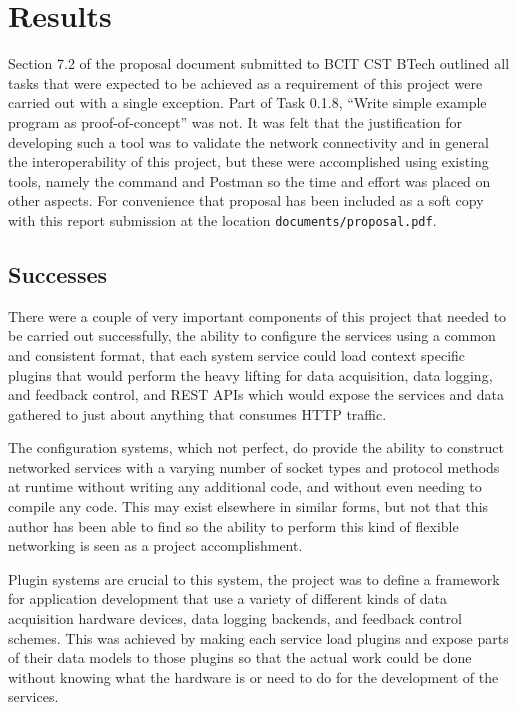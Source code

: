 \section{Results}\label{sec:results}

  Section 7.2 of the proposal document submitted to BCIT CST BTech outlined all
  tasks that were expected to be achieved as a requirement of this project were
  carried out with a single exception. Part of Task 0.1.8, ``Write simple
  example program as proof-of-concept'' was not. It was felt that the
  justification for developing such a tool was to validate the network
  connectivity and in general the interoperability of this project, but these
  were accomplished using existing tools, namely the command  and
  Postman so the time and effort was placed on other aspects. For convenience
  that proposal has been included as a soft copy with this report submission at
  the location \texttt{documents/proposal.pdf}.

  \subsection{Successes}\label{sec:results-successes}

    There were a couple of very important components of this project that
    needed to be carried out successfully, the ability to configure the
    services using a common and consistent format, that each system service
    could load context specific plugins that would perform the heavy lifting
    for data acquisition, data logging, and feedback control, and REST APIs
      which would expose the services and data gathered to just about anything
      that consumes HTTP traffic.

    The configuration systems, which not perfect, do provide the ability to
    construct networked services with a varying number of socket types and
    protocol methods at runtime without writing any additional code, and
    without even needing to compile any code. This may exist elsewhere in
    similar forms, but not that this author has been able to find so the
    ability to perform this kind of flexible networking is seen as a project
    accomplishment.

    Plugin systems are crucial to this system, the project was to define a
    framework for application development that use a variety of different kinds
    of data acquisition hardware devices, data logging backends, and feedback
    control schemes. This was achieved by making each service load plugins and
    expose parts of their data models to those plugins so that the actual work
    could be done without knowing what the hardware is or need to do for the
    development of the services.

